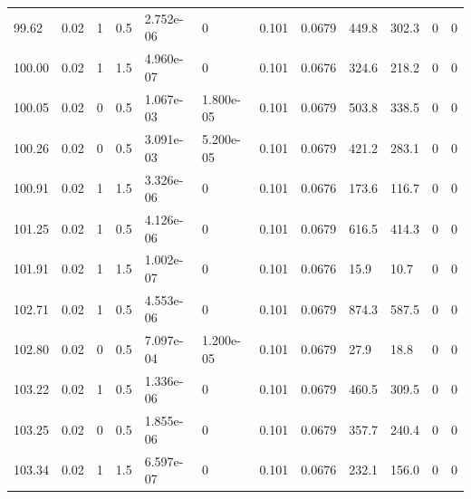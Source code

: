 \documentclass[preview]{standalone}
\begin{document}
{{{{{{\begin{tabular}{L{1.2cm}C{1.2cm} C{0.3cm}C{0.5cm} C{1.4cm}C{1.4cm} C{1.4cm}C{1.4cm} C{1.6cm}C{1.6cm} C{1.6cm}C{1.6cm}}
  99.62  &  0.02  & 1     & 0.5 &  2.752e-06  & 0  &  0.101&   0.0679& 449.8 & 302.3   &  0 & 0  \\ 
  100.00  &  0.02  & 1     & 1.5 &  4.960e-07  & 0  &  0.101&   0.0676& 324.6 & 218.2   &  0 & 0  \\ 
  100.05  &  0.02  & 0     & 0.5 &  1.067e-03  & 1.800e-05  &  0.101&   0.0679& 503.8 & 338.5   &  0 & 0  \\ 
  100.26  &  0.02  & 0     & 0.5 &  3.091e-03  & 5.200e-05  &  0.101&   0.0679& 421.2 & 283.1   &  0 & 0  \\ 
  100.91  &  0.02  & 1     & 1.5 &  3.326e-06  & 0  &  0.101&   0.0676& 173.6 & 116.7   &  0 & 0  \\ 
  101.25  &  0.02  & 1     & 0.5 &  4.126e-06  & 0  &  0.101&   0.0679& 616.5 & 414.3   &  0 & 0  \\ 
  101.91  &  0.02  & 1     & 1.5 &  1.002e-07  & 0  &  0.101&   0.0676& 15.9 & 10.7   &  0 & 0  \\ 
  102.71  &  0.02  & 1     & 0.5 &  4.553e-06  & 0  &  0.101&   0.0679& 874.3 & 587.5   &  0 & 0  \\ 
  102.80  &  0.02  & 0     & 0.5 &  7.097e-04  & 1.200e-05  &  0.101&   0.0679& 27.9 & 18.8   &  0 & 0  \\ 
  103.22  &  0.02  & 1     & 0.5 &  1.336e-06  & 0  &  0.101&   0.0679& 460.5 & 309.5   &  0 & 0  \\ 
  103.25  &  0.02  & 0     & 0.5 &  1.855e-06  & 0  &  0.101&   0.0679& 357.7 & 240.4   &  0 & 0  \\ 
  103.34  &  0.02  & 1     & 1.5 &  6.597e-07  & 0  &  0.101&   0.0676& 232.1 & 156.0   &  0 & 0  \\ 
\hline 
\end{tabular} 

}}}}}}
\end{document}
